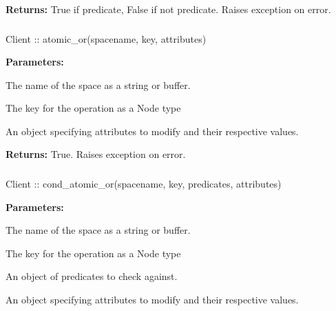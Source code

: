 \noindent\textbf{Returns:}
True if predicate, False if not predicate.  Raises exception on error.

\subsubsection{}
\label{api:nodejs:atomic_or}
\begin{javascriptcode}
Client :: atomic_or(spacename, key, attributes)
\end{javascriptcode}


\noindent\textbf{Parameters:}
\begin{description}[labelindent=\widthof{{\code{attributes}}},leftmargin=*,noitemsep,nolistsep,align=right]
\item[\code{spacename}] The name of the space as a string or buffer.
\item[\code{key}] The key for the operation as a Node type
\item[\code{attributes}] An object specifying attributes to modify and their respective values.
\end{description}

\noindent\textbf{Returns:}
True.  Raises exception on error.

\subsubsection{}
\label{api:nodejs:cond_atomic_or}
\begin{javascriptcode}
Client :: cond_atomic_or(spacename, key, predicates, attributes)
\end{javascriptcode}


\noindent\textbf{Parameters:}
\begin{description}[labelindent=\widthof{{\code{predicates}}},leftmargin=*,noitemsep,nolistsep,align=right]
\item[\code{spacename}] The name of the space as a string or buffer.
\item[\code{key}] The key for the operation as a Node type
\item[\code{predicates}] An object of predicates to check against.
\item[\code{attributes}] An object specifying attributes to modify and their respective values.
\end{description}

